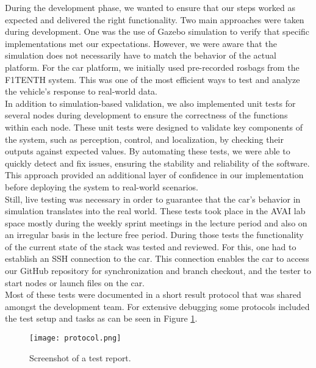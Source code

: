 During the development phase, we wanted to ensure that our steps worked as expected and delivered the right functionality. Two main approaches were taken during development. One was the use of Gazebo simulation to verify that specific implementations met our expectations. However, we were aware that the simulation does not necessarily have to match the behavior of the actual platform. For the car platform, we initially used pre-recorded rosbags from the F1TENTH system. This was one of the most efficient ways to test and analyze the vehicle’s response to real-world data.\\
\newline
In addition to simulation-based validation, we also implemented unit tests for several nodes during development to ensure the correctness of the functions within each node. These unit tests were designed to validate key components of the system, such as perception, control, and localization, by checking their outputs against expected values. By automating these tests, we were able to quickly detect and fix issues, ensuring the stability and reliability of the software. This approach provided an additional layer of confidence in our implementation before deploying the system to real-world scenarios.\\
\newline
Still, live testing was necessary in order to guarantee that the car's behavior in simulation translates into the real world. These tests took place in the AVAI lab space mostly during the weekly sprint meetings in the lecture period and also on an irregular basis in the lecture free period. During those tests the functionality of the current state of the stack was tested and reviewed. For this, one had to establish an SSH connection to the car. This connection enables the car to access our GitHub repository for synchronization and branch checkout, and the tester to start nodes or launch files on the car. \\
\newline
Most of these tests were documented in a short result protocol that was shared amongst the development team. For extensive debugging some protocols included the test setup and tasks as can be seen in Figure \ref{fig:protocol}.

\begin{figure}[htp]
	\vskip 0.2in
	\begin{center}
		\centerline{\texttt{[image: protocol.png]}}
		\caption{Screenshot of a test report.}
		\label{fig:protocol}
	\end{center}
	\vskip -0.2in
\end{figure}
